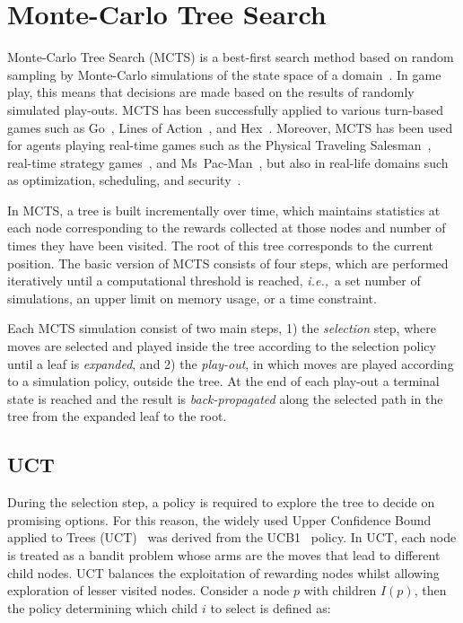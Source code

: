 \documentclass[a4paper]{llncs}
\newcommand{\ie}{{\it i.e.,}~}
\begin{document}
\section{Monte-Carlo Tree Search}
\label{sec:mcts}

Monte-Carlo Tree Search (MCTS) is a best-first search method based on random sampling by Monte-Carlo simulations of the state space of a domain~\cite{coulom2007efficient,kocsis2006bandit}. In game play, this means that decisions are made based on the results of randomly simulated play-outs. MCTS has been successfully applied to various turn-based games such as Go~\cite{lee2010current}, Lines of Action~\cite{Winands2010b}, and Hex~\cite{arneson2010monte}. Moreover, MCTS has been used for agents playing real-time games such as the Physical Traveling Salesman~\cite{powleytsp}, real-time strategy games~\cite{balla2009uct}, and Ms~Pac-Man~\cite{realtime2014}, but also in real-life domains such as optimization, scheduling, and security~\cite{browne2012survey}.

In MCTS, a tree is built incrementally over time, which maintains statistics at each node corresponding to the rewards collected at those nodes and number of times they have been visited. The root of this tree corresponds to the current position. The basic version of MCTS consists of four steps, which are performed iteratively until a computational threshold is reached, \ie a set number of simulations, an upper limit on memory usage, or a time constraint. 

Each MCTS simulation consist of two main steps, 1) the \emph{selection} step, where moves are selected and played inside the tree according to the selection policy until a leaf is \emph{expanded}, and 2) the \emph{play-out}, in which moves are played according to a simulation policy, outside the tree. At the end of each play-out a terminal state is reached and the result is \emph{back-propagated} along the selected path in the tree from the expanded leaf to the root.

\subsection{UCT}
\label{subsec:uct}
During the selection step, a policy is required to explore the tree to decide on promising options. For this reason, the widely used Upper Confidence Bound applied to Trees (UCT)~\cite{kocsis2006bandit} was derived from the UCB1~\cite{auer2002using} policy. In UCT, each node is treated as a bandit problem whose arms are the moves that lead to different child nodes. UCT balances the exploitation of rewarding nodes whilst allowing exploration of lesser visited nodes. Consider a node $p$ with children $I(p)$, then the policy determining which child $i$ to select is defined as:
\end{document}
